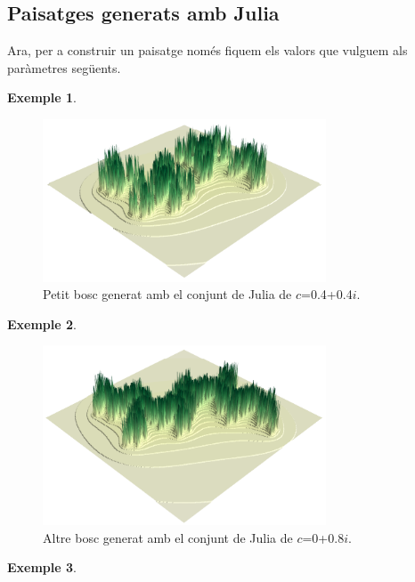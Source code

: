 \documentclass[12pt,a4paper]{report}
\newtheorem{eje}{Exemple}[chapter]
\begin{document}
\subsection{Paisatges generats amb Julia}
{
}
\newpage
Ara, per a construir un paisatge només fiquem els valors que vulguem als paràmetres següents.
{
}

\begin{eje}\hspace{0cm}
{
}
\end{eje}

\begin{figure}[!ht]
\centering
\includegraphics[width=0.75\textwidth]{img/julia_forest_01.png}
\caption{Petit bosc generat amb el conjunt de Julia de $c$=0.4+0.4$i$.}
\end{figure}

\begin{eje}\hspace{0cm}
{
}
\end{eje}

\begin{figure}[!ht]
\centering
\includegraphics[width=0.75\textwidth]{img/julia_forest_02.png}
\caption{Altre bosc generat amb el conjunt de Julia de $c$=0+0.8$i$. }
\end{figure}
\newpage
\begin{eje}\hspace{0cm}
{
}
\end{eje}
\end{document}
